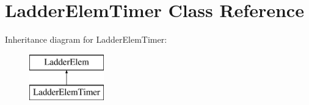 \hypertarget{class_ladder_elem_timer}{\section{Ladder\-Elem\-Timer Class Reference}
\label{class_ladder_elem_timer}
}
Inheritance diagram for Ladder\-Elem\-Timer\-:\begin{figure}[H]
\begin{center}
\leavevmode
\includegraphics[height=2.000000cm]{class_ladder_elem_timer}
\end{center}
\end{figure}
